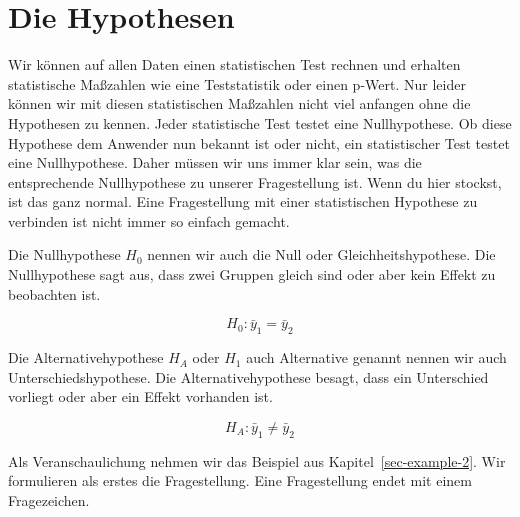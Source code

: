 \documentclass[
  letterpaper,
]{scrbook}
\begin{document}
\hypertarget{sec-hypothesen}{%
\section{Die Hypothesen}\label{sec-hypothesen}}


Wir können auf allen Daten einen statistischen Test rechnen und erhalten
statistische Maßzahlen wie eine Teststatistik oder einen p-Wert. Nur
leider können wir mit diesen statistischen Maßzahlen nicht viel anfangen
ohne die Hypothesen zu kennen. Jeder statistische Test testet eine
Nullhypothese. Ob diese Hypothese dem Anwender nun bekannt ist oder
nicht, ein statistischer Test testet eine Nullhypothese. Daher müssen
wir uns immer klar sein, was die entsprechende Nullhypothese zu unserer
Fragestellung ist. Wenn du hier stockst, ist das ganz normal. Eine
Fragestellung mit einer statistischen Hypothese zu verbinden ist nicht
immer so einfach gemacht.

\begin{tcolorbox}[enhanced jigsaw, coltitle=black, titlerule=0mm, bottomrule=.15mm, opacityback=0, opacitybacktitle=0.6, leftrule=.75mm, title=\textcolor{quarto-callout-important-color}{\faExclamation}\hspace{0.5em}{Die Nullhypothese \(H_0\) und die Alternativehypothese \(H_A\)}, toprule=.15mm, bottomtitle=1mm, toptitle=1mm, left=2mm, breakable, arc=.35mm, colback=white, rightrule=.15mm, colbacktitle=quarto-callout-important-color!10!white, colframe=quarto-callout-important-color-frame]
Die Nullhypothese \(H_0\) nennen wir auch die Null oder
Gleichheitshypothese. Die Nullhypothese sagt aus, dass zwei Gruppen
gleich sind oder aber kein Effekt zu beobachten ist.

\[
H_0: \bar{y}_{1} = \bar{y}_{2}
\]

Die Alternativehypothese \(H_A\) oder \(H_1\) auch Alternative genannt
nennen wir auch Unterschiedshypothese. Die Alternativehypothese besagt,
dass ein Unterschied vorliegt oder aber ein Effekt vorhanden ist.

\[
H_A: \bar{y}_{1} \neq \bar{y}_{2}
\]
\end{tcolorbox}

Als Veranschaulichung nehmen wir das Beispiel aus
Kapitel~\ref{sec-example-2}. Wir formulieren als erstes die
Fragestellung. Eine Fragestellung endet mit einem Fragezeichen.
\end{document}
